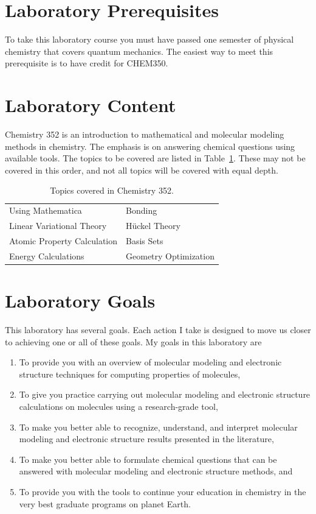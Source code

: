 \documentclass[letterpaper,oneside,onecolumn,11pt,article]{memoir}
\begin{document}
\section{Laboratory Prerequisites}
To take this laboratory course you must have passed one semester of physical chemistry that covers quantum mechanics. The easiest way to meet this prerequisite is to have credit for CHEM350. 

\section{Laboratory Content}
Chemistry 352 is an introduction to mathematical and molecular modeling methods in chemistry. The emphasis is on answering chemical questions using available tools. The topics to be covered are listed in Table~\ref{tab:topics}. These may not be covered in this order, and not all topics will be covered with equal depth. 

\begin{table}[h]
\caption{\sffamily Topics covered in Chemistry 352.}
\label{tab:topics}
\begin{tabular}{l|l} \toprule
Using Mathematica & Bonding \\
Linear Variational Theory & H\"uckel Theory \\
Atomic Property Calculation & Basis Sets  \\
Energy Calculations & Geometry Optimization \\
\bottomrule
\end{tabular}
\end{table}
%
%
\section{Laboratory Goals}
This laboratory has several goals. Each action I take is designed to move us closer to achieving one or all of these goals. My goals in this laboratory are
\begin{enumerate}[1.]
\item To provide you with an overview of molecular modeling and electronic structure techniques for computing properties of molecules,
\item To give you practice carrying out molecular modeling and electronic structure calculations on molecules using a research-grade tool,
\item To make you better able to recognize, understand, and interpret molecular modeling and electronic structure results presented in the literature,
\item To make you better able to formulate chemical questions that can be answered with molecular modeling and electronic structure methods, and
\item To provide you with the tools to continue your education in chemistry in the very best graduate programs on planet Earth.
\end{enumerate}
%
%
\end{document}
